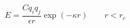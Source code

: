 \documentclass[12pt]{article}
\begin{document}
$$
  E = \frac{C q_i q_j}{\epsilon  r} \exp(- \kappa r) \qquad r < r_c
$$
\end{document}
